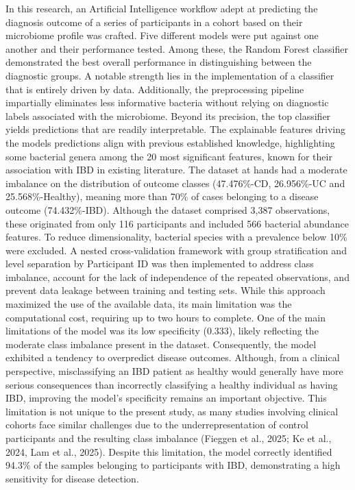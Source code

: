 \documentclass[twoside,twocolumn,10pt]{article}
\begin{document}
In this research, an Artificial Intelligence workflow adept at predicting the diagnosis outcome of a series of participants in a cohort based on their microbiome profile was crafted. Five different models were put against one another and their performance tested. Among these, the Random Forest classifier demonstrated the best overall performance in distinguishing between the diagnostic groups. A notable strength lies in the implementation of a classifier that is entirely driven by data. Additionally, the preprocessing pipeline impartially eliminates less informative bacteria without relying on diagnostic labels associated with the microbiome. Beyond its precision, the top classifier yields predictions that are readily interpretable. The explainable features driving the models predictions align with previous established knowledge, highlighting some bacterial genera among the 20 most significant features, known for their association with IBD in existing literature.
The dataset at hands had a moderate imbalance on the distribution of outcome classes (47.476\%-CD, 26.956\%-UC and 25.568\%-Healthy), meaning more than 70\% of cases belonging to a disease outcome (74.432\%-IBD). 
Although the dataset comprised 3,387 observations, these originated from only 116 participants and included 566 bacterial abundance features. To reduce dimensionality, bacterial species with a prevalence below 10\% were excluded. A nested cross-validation framework with group stratification and level separation by Participant ID was then implemented to address class imbalance, account for the lack of independence of the repeated observations, and prevent data leakage between training and testing sets. While this approach maximized the use of the available data, its main limitation was the computational cost, requiring up to two hours to complete.
One of the main limitations of the model was its low specificity (0.333), likely reflecting the moderate class imbalance present in the dataset. Consequently, the model exhibited a tendency to overpredict disease outcomes. Although, from a clinical perspective, misclassifying an IBD patient as healthy would generally have more serious consequences than incorrectly classifying a healthy individual as having IBD, improving the model's specificity remains an important objective. This limitation is not unique to the present study, as many studies involving clinical cohorts face similar challenges due to the underrepresentation of control participants and the resulting class imbalance (Fieggen et al., 2025; Ke et al., 2024, Lam et al., 2025).
Despite this limitation, the model correctly identified 94.3\% of the samples belonging to participants with IBD, demonstrating a high sensitivity for disease detection. 
\end{document}
